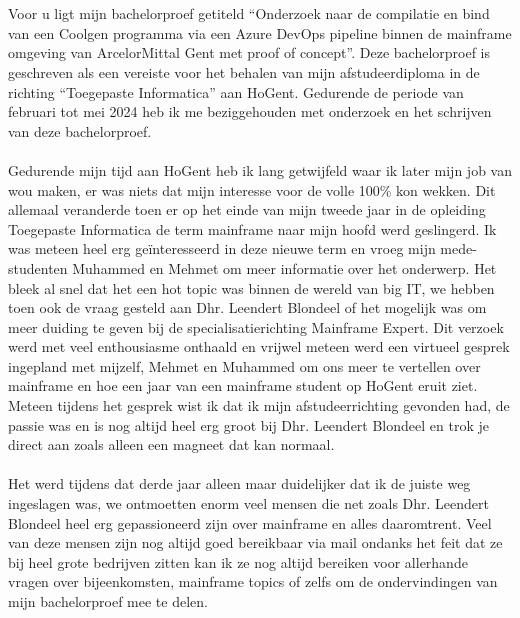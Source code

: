 
\chapter*{}%
\label{ch:voorwoord}

Voor u ligt mijn bachelorproef getiteld \enquote{Onderzoek naar de compilatie en bind van een Coolgen programma via een Azure DevOps pipeline binnen de mainframe omgeving van ArcelorMittal Gent met proof of concept}. 
Deze bachelorproef is geschreven als een vereiste voor het behalen van mijn afstudeerdiploma in de richting \enquote{Toegepaste Informatica} aan HoGent.
Gedurende de periode van februari tot mei 2024 heb ik me beziggehouden met onderzoek en het schrijven van deze bachelorproef. 
\\ \\
Gedurende mijn tijd aan HoGent heb ik lang getwijfeld waar ik later mijn job van wou maken, er was niets dat mijn interesse voor de volle 100\% kon wekken. 
Dit allemaal veranderde toen er op het einde van mijn tweede jaar in de opleiding Toegepaste Informatica de term mainframe naar mijn hoofd werd geslingerd. 
Ik was meteen heel erg geïnteresseerd in deze nieuwe term en vroeg mijn mede-studenten Muhammed en Mehmet om meer informatie over het onderwerp. 
Het bleek al snel dat het een hot topic was binnen de wereld van big IT, we hebben toen ook de vraag gesteld aan Dhr. Leendert Blondeel of het mogelijk was om meer duiding te geven bij de specialisatierichting Mainframe Expert. 
Dit verzoek werd met veel enthousiasme onthaald en vrijwel meteen werd een virtueel gesprek ingepland met mijzelf, Mehmet en Muhammed om ons meer te vertellen over mainframe en hoe een jaar van een mainframe student op HoGent eruit ziet.
Meteen tijdens het gesprek wist ik dat ik mijn afstudeerrichting gevonden had, de passie was en is nog altijd heel erg groot bij Dhr. Leendert Blondeel en trok je direct aan zoals alleen een magneet dat kan normaal. 
\\ \\
Het werd tijdens dat derde jaar alleen maar duidelijker dat ik de juiste weg ingeslagen was, we ontmoetten enorm veel mensen die net zoals Dhr. Leendert Blondeel heel erg gepassioneerd zijn over mainframe en alles daaromtrent. 
Veel van deze mensen zijn nog altijd goed bereikbaar via mail ondanks het feit dat ze bij heel grote bedrijven zitten kan ik ze nog altijd bereiken voor allerhande vragen over bijeenkomsten, mainframe topics of zelfs om de ondervindingen van mijn bachelorproef mee te delen. 
